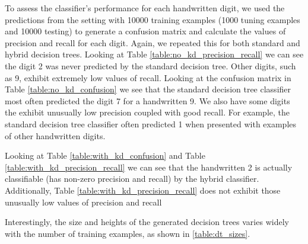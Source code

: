 To assess the classifier's performance for each handwritten digit, we used the predictions from the setting with 10000 training examples (1000 tuning examples and 10000 testing) to generate a confusion matrix and calculate the values of precision and recall for each digit.  Again, we repeated this for both standard and hybrid decision trees.  Looking at Table \ref{table:no_kd_precision_recall} we can see the digit 2 was never predicted by the standard decision tree.  Other digits, such as 9, exhibit extremely low values of recall. Looking at the confusion matrix in Table \ref{table:no_kd_confusion} we see that the standard decision tree classifier most often predicted the digit 7 for a handwritten 9.  We also have some digits the exhibit unusually low precision coupled with good recall.  For example, the standard decision tree classifier often predicted 1 when presented with examples of other handwritten digits.

Looking at Table \ref{table:with_kd_confusion} and Table \ref{table:with_kd_precision_recall} we can see that the handwritten 2 is actually classifiable (has non-zero precision and recall) by the hybrid classifier.  Additionally, Table \ref{table:with_kd_precision_recall} does not exhibit those unusually low values of precision and recall

Interestingly, the size and heights of the generated decision trees varies widely with the number of training examples, as shown in \ref{table:dt_sizes}.

